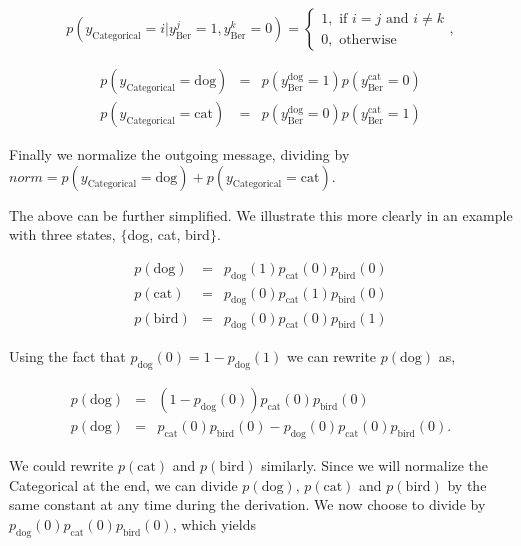 \documentclass{article}
\begin{document}
\begin{equation}
    p(y_{\text{Categorical}}=i|y^j_{\text{Ber}}=1, y^k_{\text{Ber}}=0) = \begin{cases}1, \text{ if } i=j \text{ and } i \neq k \\ 0, \text{ otherwise} \end{cases},
\end{equation}

\begin{eqnarray}\label{eq:Bernoulli-categorical}
    p(y_\text{Categorical}=\text{dog}) &=& p(y^\text{dog}_{\text{Ber}}=1)p(y^\text{cat}_{\text{Ber}}=0) \nonumber \\
    p(y_\text{Categorical}=\text{cat}) &=& p(y^\text{dog}_{\text{Ber}}=0)p(y^\text{cat}_{\text{Ber}}=1) 
\end{eqnarray}

Finally we normalize the outgoing message, dividing by $norm=p(y_\text{Categorical}=\text{dog})+p(y_\text{Categorical}=\text{cat})$.

The above can be further simplified.  We illustrate this more clearly in an example with three states, $\{$dog, cat, bird$\}$.

\begin{eqnarray}
    p(\text{dog})& =& p_{\text{dog}}(1)p_{\text{cat}}(0)p_{\text{bird}}(0) \nonumber \\
    p(\text{cat})& =& p_{\text{dog}}(0)p_{\text{cat}}(1)p_{\text{bird}}(0) \nonumber \\
    p(\text{bird})& =& p_{\text{dog}}(0)p_{\text{cat}}(0)p_{\text{bird}}(1)
\end{eqnarray}

Using the fact that $p_{\text{dog}}(0) = 1- p_{\text{dog}}(1)$ we can rewrite $p(\text{dog})$ as,

\begin{eqnarray}
    p(\text{dog}) &=& (1-p_{\text{dog}}(0))p_{\text{cat}}(0)p_{\text{bird}}(0)  \\
    p(\text{dog}) &=& p_{\text{cat}}(0)p_{\text{bird}}(0) - p_{\text{dog}}(0)p_{\text{cat}}(0)p_{\text{bird}}(0).
\end{eqnarray}

We could rewrite $p(\text{cat})$ and $p(\text{bird})$ similarly.  Since we will normalize the Categorical at the end, we can divide $p(\text{dog})$, $p(\text{cat})$ and $p(\text{bird})$ by the same constant at any time during the derivation.  We now choose to divide by $p_{\text{dog}}(0)p_{\text{cat}}(0)p_{\text{bird}}(0)$, which yields
\end{document}
